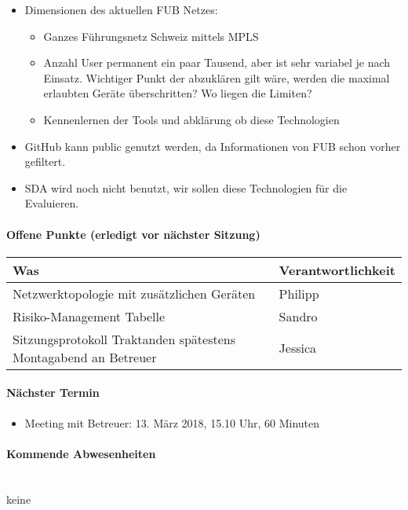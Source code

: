 \begin{itemize}
	\item Dimensionen des aktuellen FUB Netzes:
	\begin{itemize}
		\item Ganzes Führungsnetz Schweiz mittels MPLS
		\item Anzahl User permanent ein paar Tausend, aber ist sehr variabel je nach Einsatz. Wichtiger Punkt der abzuklären gilt wäre, werden die maximal erlaubten Geräte überschritten? Wo liegen die Limiten?
		\item Kennenlernen der Tools und abklärung ob diese Technologien 
	\end{itemize}
	\item GitHub kann public genutzt werden, da Informationen von FUB schon vorher gefiltert.
	\item SDA wird noch nicht benutzt, wir sollen diese Technologien für die Evaluieren.
\end{itemize}

\paragraph{Offene Punkte (erledigt vor nächster Sitzung)} \mbox{}
\begin{table}[H]
	\centering
	\begin{tabularx}{\textwidth}{X | p{4.5cm}}
		\rowcolor{gray!50}
		\textbf{Was} & \textbf{Verantwortlichkeit} \\
		\hline	
		Netzwerktopologie mit zusätzlichen Geräten & Philipp \\	
		Risiko-Management Tabelle & Sandro \\
		Sitzungsprotokoll Traktanden spätestens Montagabend an Betreuer	& Jessica \\		
	\end{tabularx}
	\label{tab:my-label}
\end{table}

\paragraph{Nächster Termin}
\begin{itemize}	
	\item Meeting mit Betreuer: 13. März 2018, 15.10 Uhr, 60 Minuten
\end{itemize}

\paragraph{Kommende Abwesenheiten} \mbox{}\\
keine

